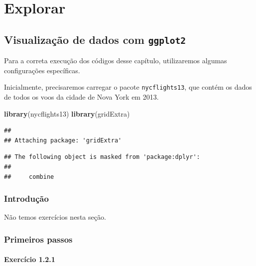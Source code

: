 \documentclass[
]{latex/krantz}
\newenvironment{Shaded}{\begin{snugshade}}{\end{snugshade}}
\newcommand{\FunctionTok}[1]{\textcolor[rgb]{0.13,0.29,0.53}{\textbf{#1}}}
\newcommand{\NormalTok}[1]{#1}
\theoremstyle{definition}
\theoremstyle{definition}
\theoremstyle{definition}
\theoremstyle{definition}
\theoremstyle{remark}
\begin{document}
\mainmatter

\hypertarget{part-explorar}{%
\part{Explorar}\label{part-explorar}}

\hypertarget{visualizauxe7uxe3o-de-dados-com-ggplot2}{%
\chapter{\texorpdfstring{Visualização de dados com \texttt{ggplot2}}{Visualização de dados com ggplot2}}\label{visualizauxe7uxe3o-de-dados-com-ggplot2}}

Para a correta execução dos códigos desse capítulo, utilizaremos algumas configurações específicas.

Inicialmente, precisaremos carregar o pacote \texttt{nycflights13}, que contém os dados de todos os voos da cidade de Nova York em 2013.

\begin{Shaded}
\begin{Highlighting}[]
\FunctionTok{library}\NormalTok{(nycflights13)}
\FunctionTok{library}\NormalTok{(gridExtra)}
\end{Highlighting}
\end{Shaded}

\begin{verbatim}
## 
## Attaching package: 'gridExtra'
\end{verbatim}

\begin{verbatim}
## The following object is masked from 'package:dplyr':
## 
##     combine
\end{verbatim}

\hypertarget{introduuxe7uxe3o}{%
\section{Introdução}\label{introduuxe7uxe3o}}

Não temos exercícios nesta seção.

\hypertarget{primeiros-passos}{%
\section{Primeiros passos}\label{primeiros-passos}}

\hypertarget{exr1-2-1}{%
\subsection*{Exercício 1.2.1}\label{exr1-2-1}}
\end{document}
